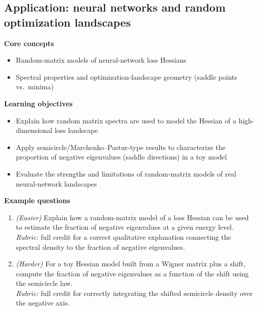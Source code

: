 \documentclass[11pt]{article}
\begin{document}
\subsection{Application: neural networks and random optimization landscapes}
\textbf{Core concepts}
\begin{itemize}[nosep]
\item Random-matrix models of neural-network loss Hessians
\item Spectral properties and optimization-landscape geometry (saddle points vs.\ minima)
\end{itemize}
\textbf{Learning objectives}
\begin{itemize}[nosep]
\item Explain how random matrix spectra are used to model the Hessian of a high-dimensional loss landscape
\item Apply semicircle/Marchenko--Pastur-type results to characterize the proportion of negative eigenvalues (saddle directions) in a toy model
\item Evaluate the strengths and limitations of random-matrix models of real neural-network landscapes
\end{itemize}
\textbf{Example questions}
\begin{enumerate}[nosep]
\item \emph{(Easier)} Explain how a random-matrix model of a loss Hessian can be used to estimate the fraction of negative eigenvalues at a given energy level. \\
\emph{Rubric:} full credit for a correct qualitative explanation connecting the spectral density to the fraction of negative eigenvalues.
\item \emph{(Harder)} For a toy Hessian model built from a Wigner matrix plus a shift, compute the fraction of negative eigenvalues as a function of the shift using the semicircle law. \\
\emph{Rubric:} full credit for correctly integrating the shifted semicircle density over the negative axis.
\end{enumerate}
\end{document}
